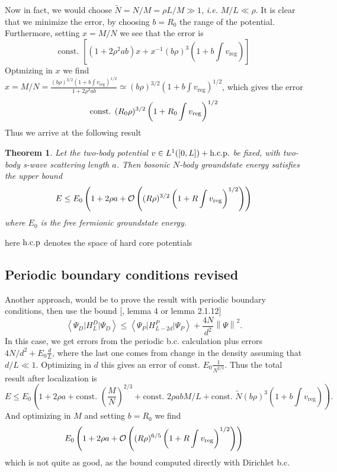 \documentclass[a4paper,11pt]{article}
\newcommand{\norm}[1]{\left\lVert #1 \right\rVert}
\renewcommand{\braket}[1]{\left\langle#1\right\rangle}
\newcommand{\ie}{\emph{i.e.} }
\newtheorem{theorem}{Theorem}
\numberwithin{equation}{section}
\begin{document}
	Now in fact, we would choose $ \tilde{N}=N/M=\rho L/M\gg 1 $, \ie $ M/L\ll \rho $. It is clear that we minimize the error, by choosing $ b=R_0 $ the range of the potential. Furthermore, setting $ x=M/N $ we see that the error is \begin{equation}
	\text{const. }\left[(1+2\rho^2 ab)x+x^{-1}(b\rho)^3\left(1+b\int v_{\text{reg}}\right)\right]
	\end{equation}
	Optmizing in $ x $ we find $ x=M/N=\frac{(b\rho)^{3/2}\left(1+b\int v_{\text{reg}}\right)^{1/2}}{1+2\rho^2 a b}\simeq(b\rho)^{3/2}\left(1+b\int v_{\text{reg}}\right)^{1/2} $, which gives the error \begin{equation}
	\text{const. }(R_0\rho)^{3/2}\left(1+R_0 \int v_{\textnormal{reg}}\right)^{1/2}
	\end{equation}
	Thus we arrive at the following result
	\begin{theorem}
		Let the two-body potential $ v\in L^{1}([0,L])+\textnormal{h.c.p.} $ be fixed, with two-body s-wave scattering length $ a $. Then bosonic $ N $-body groundstate energy satisfies the upper bound\begin{equation}
		E\leq E_0\left(1+2\rho a + \mathcal{O}\left((R\rho)^{3/2}\left(1+R \int v_{\textnormal{reg}}\right)^{1/2}\right)\right)
		\end{equation}
		where $ E_0 $ is the free fermionic groundstate energy.
	\end{theorem}
	here $ \textnormal{h.c.p} $ denotes the space of hard core potentials
	
	\subsection{Periodic boundary conditions revised}
	Another approach, would be to prove the result with periodic boundary conditions, then use the bound [\cite{2020JMP....61f1901M}, lemma 4 or \cite{robinson2014thermodynamic} lemma 2.1.12] \begin{equation}
	\braket{\Psi_D\lvert H^D_L \rvert \Psi_D}\leq \braket{\Psi_P\lvert H^P_{L-2d}\rvert \Psi_P}+\frac{4N}{d^2}\norm{\Psi}^2.
	\end{equation}
	In this case, we get errors from the periodic b.c. calculation plus errors $ 4N/d^2+E_0\frac{d}{L} $, where the last one comes from change in the density assuming that $ d/L\ll 1 $. Optimizing in $ d $ this gives an error of $ \text{const. }E_0 \frac{1}{N^{2/3}} $. Thus the total result after localization is \begin{equation}
	E\leq E_0\left(1+2\rho a+\text{const. }\left(\frac{M}{N}\right)^{2/3}+\text{const. }2\rho abM/L+\text{const. }\tilde{N}(b\rho)^3\left(1+b\int v_{\text{reg}}\right)\right).
	\end{equation}
	And optimizing in $ M $ and setting $ b=R_0 $ we find\begin{equation}
	E_0\left(1+2\rho a + \mathcal{O}\left((R\rho)^{6/5}\left(1+R \int v_{\textnormal{reg}}\right)^{1/2}\right)\right)
	\end{equation}
	which is not quite as good, as the bound computed directly with Dirichlet b.c.
\end{document}
